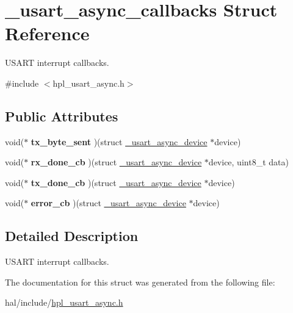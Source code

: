 \hypertarget{struct__usart__async__callbacks}{}\section{\+\_\+usart\+\_\+async\+\_\+callbacks Struct Reference}
\label{struct__usart__async__callbacks}


U\+S\+A\+RT interrupt callbacks.  




{\ttfamily \#include $<$hpl\+\_\+usart\+\_\+async.\+h$>$}

\subsection*{Public Attributes}
\begin{DoxyCompactItemize}
\item 
\mbox{\label{struct__usart__async__callbacks_a8213240efd24edc2266b1d499b42e945}} 
void($\ast$ {\bfseries tx\+\_\+byte\+\_\+sent} )(struct \hyperlink{struct__usart__async__device}{\+\_\+usart\+\_\+async\+\_\+device} $\ast$device)
\item 
\mbox{\label{struct__usart__async__callbacks_af3670aee54cc400737048dde5c64d30e}} 
void($\ast$ {\bfseries rx\+\_\+done\+\_\+cb} )(struct \hyperlink{struct__usart__async__device}{\+\_\+usart\+\_\+async\+\_\+device} $\ast$device, uint8\+\_\+t data)
\item 
\mbox{\label{struct__usart__async__callbacks_a71fe195e0159ee0b107df69b2b02f619}} 
void($\ast$ {\bfseries tx\+\_\+done\+\_\+cb} )(struct \hyperlink{struct__usart__async__device}{\+\_\+usart\+\_\+async\+\_\+device} $\ast$device)
\item 
\mbox{\label{struct__usart__async__callbacks_a7b926fce0dbc8debda16675111ae754a}} 
void($\ast$ {\bfseries error\+\_\+cb} )(struct \hyperlink{struct__usart__async__device}{\+\_\+usart\+\_\+async\+\_\+device} $\ast$device)
\end{DoxyCompactItemize}


\subsection{Detailed Description}
U\+S\+A\+RT interrupt callbacks. 

The documentation for this struct was generated from the following file\+:\begin{DoxyCompactItemize}
\item 
hal/include/\hyperlink{hpl__usart__async_8h}{hpl\+\_\+usart\+\_\+async.\+h}\end{DoxyCompactItemize}
